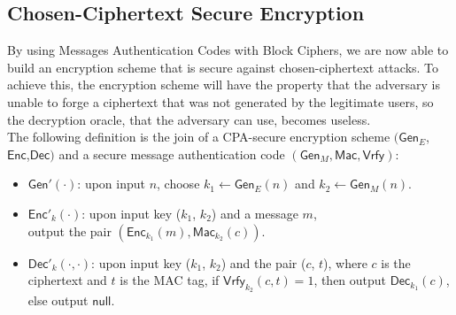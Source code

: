 \subsection{Chosen-Ciphertext Secure Encryption}
By using Messages Authentication Codes with Block Ciphers, we are now able to build an encryption scheme that is secure against chosen-ciphertext attacks. To achieve this, the encryption scheme will have the property that the adversary is unable to forge a ciphertext that was not generated by the legitimate users, so the decryption oracle, that the adversary can use, becomes useless.\\
The following definition is the join of a CPA-secure encryption scheme $(\mathsf{Gen}_E$,\\$\mathsf{Enc}$,$\mathsf{Dec})$ and a secure message authentication code $(\mathsf{Gen}_M, \mathsf{Mac}, \mathsf{Vrfy})$:
\begin{itemize}
    \item{$\mathsf{Gen}'(\cdot)$: upon input $n$, choose $k_1 \leftarrow \mathsf{Gen}_E(n)$ and $k_2 \leftarrow \mathsf{Gen}_M(n)$.}
    \item{$\mathsf{Enc}'_k(\cdot)$: upon input key ($k_1$, $k_2$) and a message $m$,\\output the pair $(\mathsf{Enc}_{k_1}(m), \mathsf{Mac}_{k_2}(c))$.}
    \item{$\mathsf{Dec}'_k(\cdot, \cdot)$: upon input key ($k_1$, $k_2$) and the pair ($c$, $t$), where $c$ is the ciphertext and $t$ is the MAC tag, if $\mathsf{Vrfy}_{k_2}(c, t) = 1$, then output $\mathsf{Dec}_{k_1}(c)$, else output $\mathsf{null}$.}
\end{itemize}
